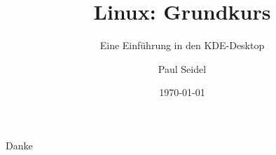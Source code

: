 \documentclass{beamer}
\title{Linux: Grundkurs}
\subtitle{Eine Einführung in den KDE-Desktop}
\author{Paul Seidel}
\date{\today} %
\institute{ZKK - Universität Passau}
\begin{document}
    \maketitle

    
    
    
    
    
    

    

    \begin{frame}[standout]
        Danke
    \end{frame}
\end{document}
